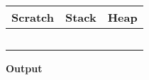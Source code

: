 \documentclass[12pt]{article}
\begin{document}

\thispagestyle{empty}

\noindent
\hspace{-0.7in}
  \begin{tabular}{| >{\centering\bfseries}p{1.2in} | >{\centering\bfseries}p{2.6in} | >{\centering\arraybackslash\bfseries}p{2.4in} |}
    \hline
    Scratch & Stack & Heap \\
    \hline & & \\[1in]
    \cline{2-2} & & \\[1in]
    \cline{2-2} & & \\[1in]
    \cline{2-2} & & \\[1in]
    \cline{2-2} & & \\[1in]
    \hline
  \end{tabular} \bigskip

  \noindent \textbf{Output}
\end{document}
